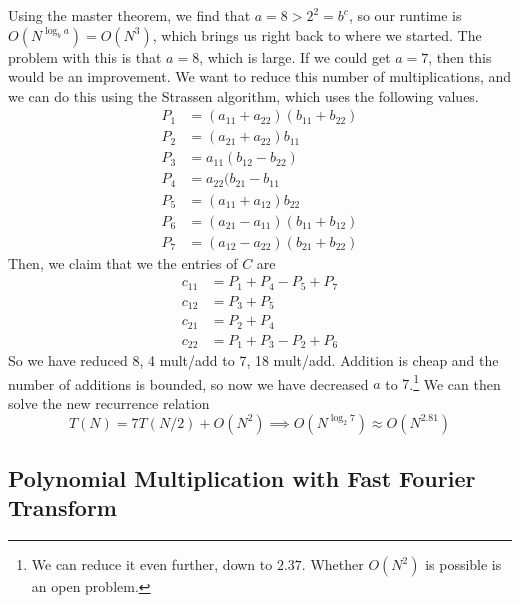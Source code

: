 \documentclass{article}
\begin{document}
      Using the master theorem, we find that $a = 8 > 2^2 = b^c$, so our runtime is $O(N^{\log_{b} a}) = O(N^3)$, which brings us right back to where we started. The problem with this is that $a = 8$, which is large. If we could get $a = 7$, then this would be an improvement. We want to reduce this number of multiplications, and we can do this using the Strassen algorithm, which uses the following values.  
      \begin{align*}
        P_1 &= (a_{11} + a_{22}) (b_{11} + b_{22}) \\
        P_2 &= (a_{21} + a_{22}) b_{11} \\
        P_3 &= a_{11} (b_{12} - b_{22}) \\
        P_4 &= a_{22} (b_{21} - b_{11} \\
        P_5 &= (a_{11} + a_{12}) b_{22} \\
        P_6 &= (a_{21} - a_{11}) (b_{11} + b_{12}) \\
        P_7 &= (a_{12} - a_{22}) (b_{21} + b_{22}) 
      \end{align*}
      Then, we claim that we the entries of $C$ are 
      \begin{align*}
          c_{11} &= P_1 + P_4 - P_5 + P_7 \\
          c_{12} &= P_3 + P_5 \\
          c_{21} &= P_2 + P_4 \\
          c_{22} &= P_1 + P_3 - P_2 + P_6
      \end{align*}
      So we have reduced 8, 4 mult/add to 7, 18 mult/add. Addition is cheap and the number of additions is bounded, so now we have decreased $a$ to $7$.\footnote{We can reduce it even further, down to $2.37$. Whether $O(N^2)$ is possible is an open problem. } We can then solve the new recurrence relation 
      \begin{equation}
        T(N) = 7 T(N/2) + O(N^2) \implies O(N^{\log_2 7}) \approx O(N^{2.81})
      \end{equation}

  \subsection{Polynomial Multiplication with Fast Fourier Transform}
\end{document}
